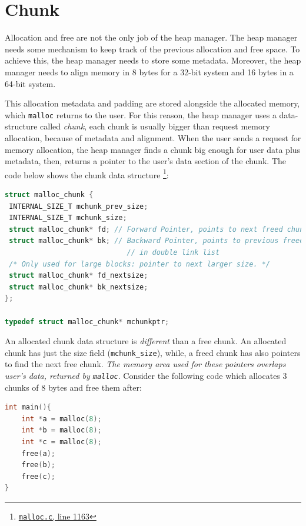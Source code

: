 \documentclass{masterthesis}
\newcommand*\mallocc{\lstinline{malloc}\xspace}
\begin{document}
\section{Chunk}
\label{sect:chunk}
Allocation and free are not the only job of the heap manager. The heap manager needs some mechanism to keep track of the previous allocation and free space.  To achieve this, the heap manager needs to store some metadata.  Moreover, the heap manager needs to align memory in 8 bytes for a 32-bit system and 16 bytes in a 64-bit system.

This allocation metadata and padding are stored alongside the allocated memory, which \mallocc{} returns to the user. For this reason, the heap manager uses a data-structure called \emph{chunk}, each chunk is usually bigger than request memory allocation, because of metadata and alignment. When the user sends a request for memory allocation, the heap manager finds a chunk big enough for user data plus metadata, then, returns a pointer to the user's data section of the chunk. The code below shows the chunk data structure \footnote{\href{https://sourceware.org/git/?p=glibc.git;a=blob;f=malloc/malloc.c;\#l1163}{\texttt{malloc.c}, line 1163}}:

\begin{lstlisting}[language=c,frame=single]
struct malloc_chunk {
 INTERNAL_SIZE_T mchunk_prev_size;
 INTERNAL_SIZE_T mchunk_size;
 struct malloc_chunk* fd; // Forward Pointer, points to next freed chunk
 struct malloc_chunk* bk; // Backward Pointer, points to previous freed chunk
                             // in double link list
 /* Only used for large blocks: pointer to next larger size. */
 struct malloc_chunk* fd_nextsize;
 struct malloc_chunk* bk_nextsize;
};

typedef struct malloc_chunk* mchunkptr;
\end{lstlisting}

An allocated chunk data structure is \emph{different} than a free chunk. An allocated chunk has just the size field (\lstinline{mchunk_size}), while, a freed chunk has also pointers to find the next free chunk.
\emph{The memory area used for these pointers overlaps user's data, returned by \mallocc{}}.
Consider the following code which allocates 3 chunks of 8 bytes and free them after:

\begin{lstlisting}[language=c,frame=tlrb]
int main(){
	int *a = malloc(8);
	int *b = malloc(8);
	int *c = malloc(8);
	free(a);
	free(b);
	free(c);
}
\end{lstlisting}
\end{document}
